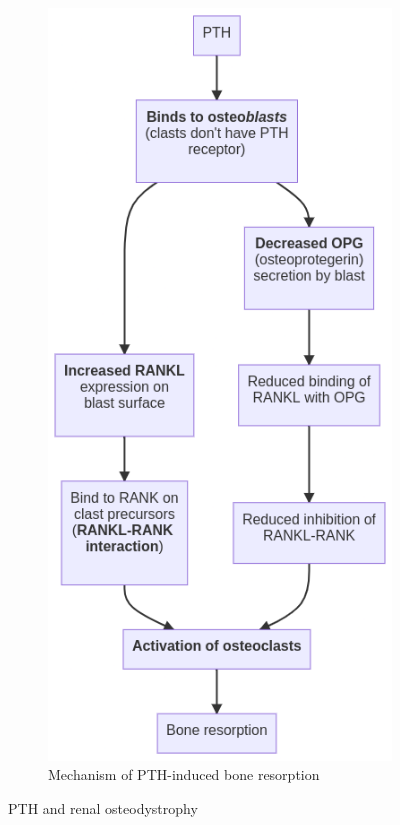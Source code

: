\documentclass[
  12pt,
]{memoir}
\begin{document}
\begin{figure}[h!]
\begin{subfigure}[t]{.4\textwidth}
        \includegraphics[width=\textwidth]{../assets/med/PTH-bone.png}
        \vspace{12mm}
        \caption{Mechanism of PTH-induced bone resorption}
    \end{subfigure}
    \vspace{15mm}
    \caption{PTH and renal osteodystrophy}
    \label{fig:ckd-osteo}
\end{figure}
\vfill
\end{document}
